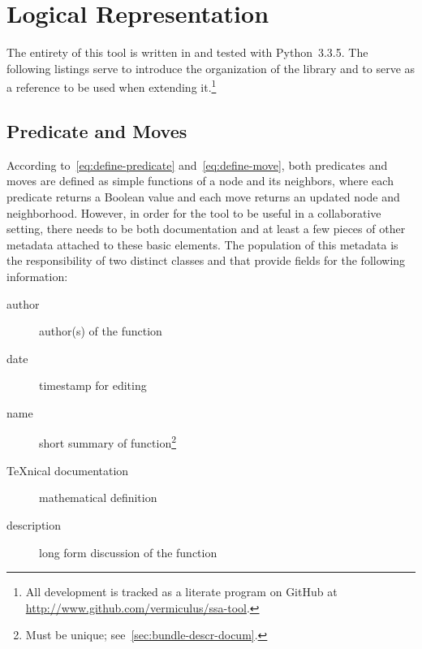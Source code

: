 \section{Logical Representation}
\label{sec:logic-repr}

The entirety of this tool is written in and tested with Python~3.3.5.
The following listings serve to introduce the organization of the library and
  to serve as a reference to be used when extending it.\footnote{%
    All development is tracked as a literate program on GitHub
    at \url{http://www.github.com/vermiculus/ssa-tool}.}

\subsection{Predicate and Moves}
\label{sec:logic-repr:predicate-move}

According to~\autoref{eq:define-predicate} and~\autoref{eq:define-move},
  both predicates and moves are defined as simple functions of
  a node and its neighbors, where
  each predicate returns a Boolean value and
  each move returns an updated node and neighborhood.
However, in order for the tool to be useful in a collaborative setting,
  there needs to be both documentation
  and at least a few pieces of other metadata attached to these basic elements.
The population of this metadata is the responsibility of two distinct classes
  \Dash {} and  \Dash
  that provide fields for the following information:
  \begin{description}
  \item[author] author(s) of the function
  \item[date] timestamp for editing
  \item[name] short summary of function\footnote{Must be unique; see~\autoref{sec:bundle-descr-docum}.}
  \item[\TeX nical documentation] mathematical definition
  \item[description] long form discussion of the function
  \end{description}

